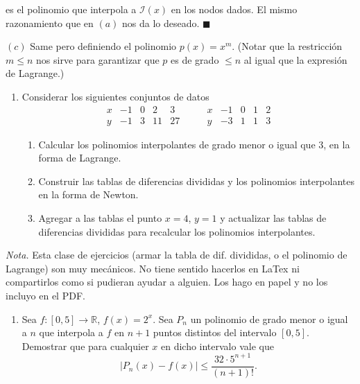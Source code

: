 \documentclass[12pt]{article}
\begin{document}
es el polinomio que interpola a $\mathcal{I}(x)$ en los nodos dados. El mismo
razonamiento que en $(a)$ nos da lo deseado. $\blacksquare$

$(c)$ Same pero definiendo el polinomio $p(x) = x^m$. (Notar que la restricción
$m \leq n$ nos sirve para garantizar que $p$ es de grado $\leq n$ al igual que
la expresión de Lagrange.)

\pagebreak 

\begin{enumerate}
\item[5.] Considerar los siguientes conjuntos de datos
\[
\begin{array}{c|rrrr}
x & -1 & 0 & 2 & 3 \\
y & -1 & 3 & 11 & 27
\end{array}
\qquad
\begin{array}{c|rrrr}
x & -1 & 0 & 1 & 2 \\
y & -3 & 1 & 1 & 3
\end{array}
\]

\begin{enumerate}
\item[a)] Calcular los polinomios interpolantes de grado menor o igual que 3, en la forma de Lagrange.

\item[b)] Construir las tablas de diferencias divididas y los polinomios interpolantes en la forma de Newton.

\item[c)] Agregar a las tablas el punto $x = 4$, $y = 1$ y actualizar las tablas de diferencias divididas para recalcular los polinomios interpolantes.
\end{enumerate}
\end{enumerate}

\textit{Nota.} Esta clase de ejercicios (armar la tabla de dif. divididas, o el
polinomio de Lagrange) son muy mecánicos. No tiene sentido hacerlos en LaTex ni
compartirlos como si pudieran ayudar a alguien. Los hago en papel y no los
incluyo en el PDF.

\pagebreak 

\begin{myframe}
    \begin{enumerate}
\item[6.] Sea $f : [0,5] \to \mathbb{R}$, $f(x) = 2^x$. Sea $P_n$ un polinomio de grado menor o igual a $n$ que interpola a $f$ en $n+1$ puntos distintos del intervalo $[0,5]$. Demostrar que para cualquier $x$ en dicho intervalo vale que
\[
\left| P_n(x) - f(x) \right| \le \frac{32 \cdot 5^{n+1}}{(n+1)!}.
\]
\end{enumerate}
\end{myframe}
\end{document}
